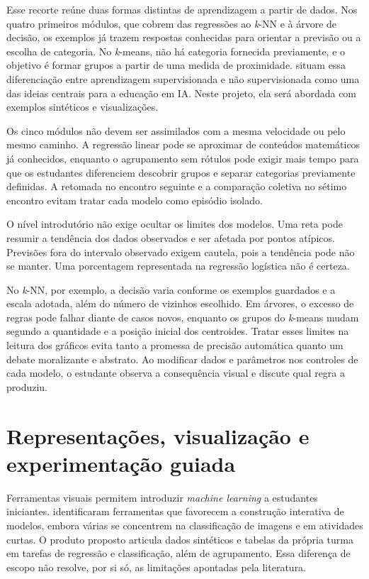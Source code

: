 Esse recorte reúne duas formas distintas de aprendizagem a partir de dados. Nos quatro primeiros módulos, que cobrem das regressões ao \textit{k}-NN e à árvore de decisão, os exemplos já trazem respostas conhecidas para orientar a previsão ou a escolha de categoria. No \textit{k}-means, não há categoria fornecida previamente, e o objetivo é formar grupos a partir de uma medida de proximidade.  situam essa diferenciação entre aprendizagem supervisionada e não supervisionada como uma das ideias centrais para a educação em IA. Neste projeto, ela será abordada com exemplos sintéticos e visualizações.

Os cinco módulos não devem ser assimilados com a mesma velocidade ou pelo mesmo caminho. A regressão linear pode se aproximar de conteúdos matemáticos já conhecidos, enquanto o agrupamento sem rótulos pode exigir mais tempo para que os estudantes diferenciem descobrir grupos e separar categorias previamente definidas. A retomada no encontro seguinte e a comparação coletiva no sétimo encontro evitam tratar cada modelo como episódio isolado.

O nível introdutório não exige ocultar os limites dos modelos. Uma reta pode resumir a tendência dos dados observados e ser afetada por pontos atípicos. Previsões fora do intervalo observado exigem cautela, pois a tendência pode não se manter. Uma porcentagem representada na regressão logística não é certeza.

No \textit{k}-NN, por exemplo, a decisão varia conforme os exemplos guardados e a escala adotada, além do número de vizinhos escolhido. Em árvores, o excesso de regras pode falhar diante de casos novos, enquanto os grupos do \textit{k}-means mudam segundo a quantidade e a posição inicial dos centroides. Tratar esses limites na leitura dos gráficos evita tanto a promessa de precisão automática quanto um debate moralizante e abstrato. Ao modificar dados e parâmetros nos controles de cada modelo, o estudante observa a consequência visual e discute qual regra a produziu.

\section{Representações, visualização e experimentação guiada}

Ferramentas visuais permitem introduzir \textit{machine learning} a estudantes iniciantes.  identificaram ferramentas que favorecem a construção interativa de modelos, embora várias se concentrem na classificação de imagens e em atividades curtas. O produto proposto articula dados sintéticos e tabelas da própria turma em tarefas de regressão e classificação, além de agrupamento. Essa diferença de escopo não resolve, por si só, as limitações apontadas pela literatura.

